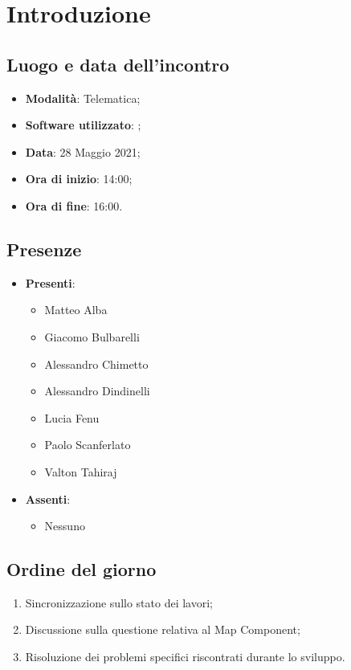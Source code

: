 \documentclass[]{article}
\begin{document}
	

	\newpage


		\section{Introduzione}
		\subsection{Luogo e data dell'incontro}
		\begin{itemize}
			\item \textbf{Modalità}: Telematica;
			\item \textbf{Software utilizzato}: ;
			\item \textbf{Data}: 28 Maggio 2021;
			\item \textbf{Ora di inizio}: 14:00;
			\item \textbf{Ora di fine}: 16:00.
		\end{itemize}

		\subsection{Presenze}
		\begin{itemize}
			\item \textbf{Presenti}:
			\begin{itemize}
				\item Matteo Alba
				\item Giacomo Bulbarelli
				\item Alessandro Chimetto
				\item Alessandro Dindinelli
				\item Lucia Fenu
				\item Paolo Scanferlato
				\item Valton Tahiraj
			\end{itemize}
			\item \textbf{Assenti}:
			\begin{itemize}
				\item Nessuno
			\end{itemize}
		\end{itemize}


		\subsection{Ordine del giorno}
		\begin{enumerate}
			\item Sincronizzazione sullo stato dei lavori;
			\item Discussione sulla questione relativa al Map Component;
			\item Risoluzione dei problemi specifici riscontrati durante lo sviluppo.
		\end{enumerate}
\end{document}
